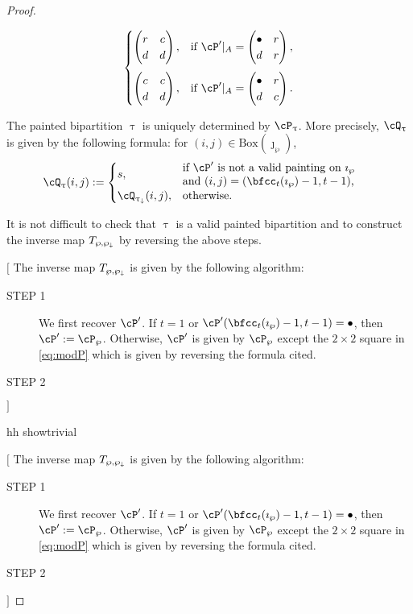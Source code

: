 \documentclass[12pt,a4paper]{amsart}
\newcommand{\trivial}[2][]{\if\relax\detokenize{#1}\relax
  {%
      \color{orange} \vspace{0em} $[$  #2 $]$
      \color{black}
  }
  \else
\ifx#1h
\ifcsname showtrivial\endcsname
{%
    \color{orange} \vspace{0em}  $[$ #2 $]$
    \color{black}
}
\fi
\else {\red Wrong argument!} \fi
\fi
}
\numberwithin{equation}{section}
\theoremstyle{remark}
\def\BOX#1{\mathrm{Box}(#1)}
\begin{document}
{\begin{proof}
\begin{description}
\begin{itemize}
\begin{equation}
\begin{split}
\begin{cases}
                  \begin{pmatrix}
                    r & c\\
                    d & d
                  \end{pmatrix}, & \text{if } \cP'|_A =
                  \begin{pmatrix}
                    \bullet & r\\
                    d & r
                  \end{pmatrix},\\[1.5em]
                  \begin{pmatrix}
                    c & c\\
                    d & d
                  \end{pmatrix}, & \text{if } \cP'|_A =
                  \begin{pmatrix}
                    \bullet & r\\
                    d & c
                  \end{pmatrix}.\\
                \end{cases}
              \end{split}
            \end{equation}
          \end{itemize}

    \item[STEP 3] The painted bipartition $\uptau$ is uniquely determined by
          $\cP_{\uptau}$. More precisely, $\cQ_{\uptau}$ is given by the following
          formula: for $(i,j)\in \BOX{\jmath_{\wp}}$,
          \[
          \cQ_{\uptau}(i,j) :=
          \begin{cases}
            s, & \begin{minipage}{17em}if $\cP'$ is not a valid painting on $\imath_{\wp}$\\
              and $(i,j)= (\bfcc_{t}(\imath_{\wp})-1,t-1)$,
              \end{minipage}\\
            \cQ_{\uptaum}(i,j), & \text{otherwise.}
            \end{cases}
          \]
  \end{description}

 It is not difficult to check that $\uptau$ is a valid painted bipartition
 and to construct the inverse map $T_{\wp,\wp_{\downarrow}}$ by reversing the above steps.

 \trivial[h]{
   The inverse map $T_{\wp,\wp_{\downarrow}}$ is given by the following algorithm:
   \begin{description}
     \item[STEP 1] We first recover $\cP'$.
           If $t=1$ or $\cP'(\bfcc_{t}(\imath_{\wp})-1,t-1)=\bullet$, then
           $\cP':= \cP_{\wp}$.
           Otherwise,
           $\cP'$ is given by $\cP_{\wp}$ except the $2\times 2$ square in
           \eqref{eq:modP} which is given by reversing the formula cited.
     \item[STEP 2]


\end{description}}
\end{proof}}
\end{document}
